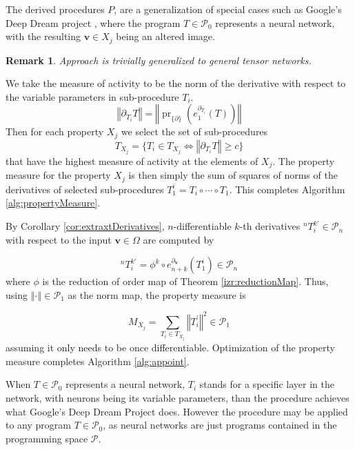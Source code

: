 \documentclass[smallcondensed]{svjour3}
\newcommand{\vv}{\mathbf{v}}
\newcommand{\dP}{\mathcal{P}}
\newcommand{\D}{\partial}
\DeclareMathOperator{\proj}{pr}
\newtheorem{opomba}{Remark}[section]
\begin{document}
   The derived procedures $P$, are a generalization of special cases such as Google's Deep Dream project \cite{DeepDream}, where the program $T\in\dP_0$ represents a neural network, with the resulting $\vv\in X_j$ being an altered image.
   
   \begin{opomba}
      Approach is trivially generalized to general tensor networks.
      \end{opomba}
   
   We take the measure of activity to be the norm of the derivative with respect to the variable parameters in sub-procedure $T_i$.
   $$\left\Vert\D_{T_i}T\right\Vert=\left\Vert \proj_{\{\D\}}\left(e^{\D_{T_i}}_1(T)\right)\right\Vert$$
   Then for each property $X_j$ we select the set of sub-procedures 
   $$T_{X_j}=\{T_i\in T_{X_j}\iff \left\Vert\D_{T_i}T\right\Vert\ge c\}$$
   that have the highest measure of activity at the elements of $X_j$. The property measure for the property $X_j$ is then simply the sum of squares of norms of the derivatives of selected sub-procedures $T^i_1=T_i\circ\cdots\circ T_1$. This completes Algorithm \ref{alg:propertyMeasure}. 
   
   By Corollary \ref{cor:extraxtDerivatives}, $n$-differentiable $k$-th derivatives $^{n}T^{k\prime}_i\in\dP_n$ with respect to the input $\vv\in\Omega$ are computed by
   
   \begin{equation}
   ^{n}T^{k\prime}_i=\phi^k\circ e^{\D_\vv}_{n+k}(T^i_1)\in\dP_n
   \end{equation}
   where $\phi$ is the reduction of order map of Theorem \ref{izr:reductionMap}.
   Thus, using $\left\Vert\cdot\right\Vert\in\dP_1$ as the norm map, the property measure is
   
   \begin{equation}
   M_{X_j}=\sum\limits_{T_i\in T_{X_j}} \left\Vert T^\prime_i\right\Vert^2\in\dP_1
   \end{equation}
   assuming it only needs to be once differentiable. Optimization of the property measure completes Algorithm \ref{alg:appoint}.
   
   When $T\in\dP_0$ represents a neural network, $T_i$ stands for a specific layer in the network, with neurons being its variable parameters, than the procedure achieves what Google's Deep Dream Project \cite{DeepDream} does. However the procedure may be applied to any program $T\in\dP_0$, as neural networks are just programs contained in the programming space $\dP$.
   
\end{document}
